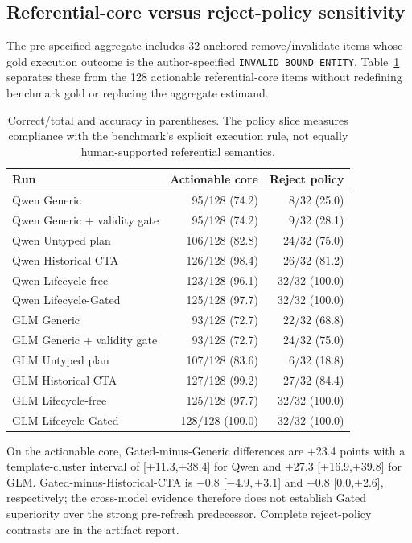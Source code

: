 \documentclass[10pt]{article}
\begin{document}
\subsection{Referential-core versus reject-policy sensitivity}
The pre-specified aggregate includes 32 anchored remove/invalidate items whose gold execution
outcome is the author-specified \texttt{INVALID\_BOUND\_ENTITY}. Table~\ref{tab:policy-split}
separates these from the 128 actionable referential-core items without redefining benchmark
gold or replacing the aggregate estimand.
\begin{table}[h]
\centering
\small
\begin{tabular}{lrr}
\toprule
Run & Actionable core & Reject policy \\
\midrule
Qwen Generic & 95/128 (74.2) & 8/32 (25.0) \\
Qwen Generic + validity gate & 95/128 (74.2) & 9/32 (28.1) \\
Qwen Untyped plan & 106/128 (82.8) & 24/32 (75.0) \\
Qwen Historical CTA & 126/128 (98.4) & 26/32 (81.2) \\
Qwen Lifecycle-free & 123/128 (96.1) & 32/32 (100.0) \\
Qwen Lifecycle-Gated & 125/128 (97.7) & 32/32 (100.0) \\
GLM Generic & 93/128 (72.7) & 22/32 (68.8) \\
GLM Generic + validity gate & 93/128 (72.7) & 24/32 (75.0) \\
GLM Untyped plan & 107/128 (83.6) & 6/32 (18.8) \\
GLM Historical CTA & 127/128 (99.2) & 27/32 (84.4) \\
GLM Lifecycle-free & 125/128 (97.7) & 32/32 (100.0) \\
GLM Lifecycle-Gated & 128/128 (100.0) & 32/32 (100.0) \\
\bottomrule
\end{tabular}
\caption{Correct/total and accuracy in parentheses. The policy slice measures compliance with
the benchmark's explicit execution rule, not equally human-supported referential semantics.}
\label{tab:policy-split}
\end{table}
On the actionable core, Gated-minus-Generic differences are +23.4 points with a
template-cluster interval of [+11.3,+38.4] for Qwen and +27.3 [+16.9,+39.8] for GLM.
Gated-minus-Historical-CTA is $-0.8$ [$-4.9,+3.1$] and +0.8 [0.0,+2.6], respectively;
the cross-model evidence therefore does not establish Gated superiority over the strong
pre-refresh predecessor. Complete reject-policy contrasts are in the artifact report.
\end{document}
